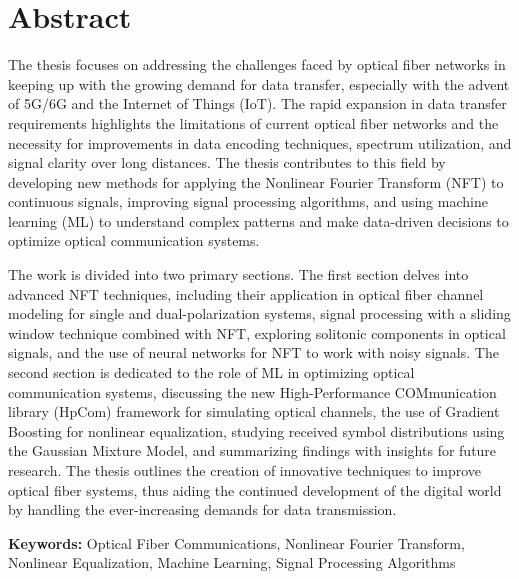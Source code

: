 

\cleardoublepage
\chapter*{Abstract}
The thesis focuses on addressing the challenges faced by optical fiber networks in keeping up with the growing demand for data transfer, especially with the advent of 5G/6G and the Internet of Things (IoT). The rapid expansion in data transfer requirements highlights the limitations of current optical fiber networks and the necessity for improvements in data encoding techniques, spectrum utilization, and signal clarity over long distances. The thesis contributes to this field by developing new methods for applying the Nonlinear Fourier Transform (NFT) to continuous signals, improving signal processing algorithms, and using machine learning (ML) to understand complex patterns and make data-driven decisions to optimize optical communication systems.

The work is divided into two primary sections. The first section delves into advanced NFT techniques, including their application in optical fiber channel modeling for single and dual-polarization systems, signal processing with a sliding window technique combined with NFT, exploring solitonic components in optical signals, and the use of neural networks for NFT to work with noisy signals. The second section is dedicated to the role of ML in optimizing optical communication systems, discussing the new High-Performance COMmunication library (HpCom) framework for simulating optical channels, the use of Gradient Boosting for nonlinear equalization, studying received symbol distributions using the Gaussian Mixture Model, and summarizing findings with insights for future research. The thesis outlines the creation of innovative techniques to improve optical fiber systems, thus aiding the continued development of the digital world by handling the ever-increasing demands for data transmission.

\vfill

\textbf{Keywords:} Optical Fiber Communications, Nonlinear Fourier Transform, Nonlinear Equalization, Machine Learning, Signal Processing Algorithms


